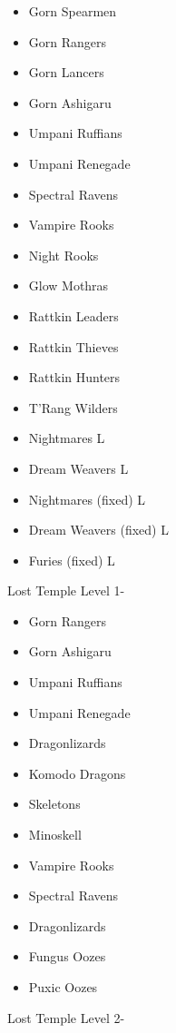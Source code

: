 \documentclass[12pt]{article}
\providecommand{\tightlist}{%
  \setlength{\itemsep}{0pt}\setlength{\parskip}{0pt}}
\begin{document}
\begin{itemize}
\tightlist
\item
  Gorn Spearmen
\item
  Gorn Rangers
\item
  Gorn Lancers
\item
  Gorn Ashigaru
\item
  Umpani Ruffians
\item
  Umpani Renegade
\item
  Spectral Ravens
\item
  Vampire Rooks
\item
  Night Rooks
\item
  Glow Mothras
\item
  Rattkin Leaders
\item
  Rattkin Thieves
\item
  Rattkin Hunters
\item
  T'Rang Wilders
\item
  Nightmares L
\item
  Dream Weavers L
\item
  Nightmares (fixed) L
\item
  Dream Weavers (fixed) L
\item
  Furies (fixed) L
\end{itemize}

Lost Temple Level 1-

\begin{itemize}
\tightlist
\item
  Gorn Rangers
\item
  Gorn Ashigaru
\item
  Umpani Ruffians
\item
  Umpani Renegade
\item
  Dragonlizards
\item
  Komodo Dragons
\item
  Skeletons
\item
  Minoskell
\item
  Vampire Rooks
\item
  Spectral Ravens
\item
  Dragonlizards
\item
  Fungus Oozes
\item
  Puxic Oozes
\end{itemize}

Lost Temple Level 2-
\end{document}
